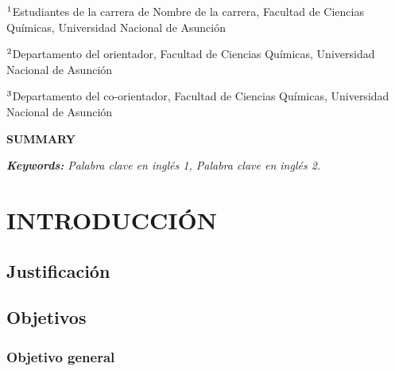 \documentclass[11pt,oneside,a4paper]{book}
\begin{document}
$^{\textnormal{1}}$Estudiantes de la carrera de Nombre de la carrera, Facultad de Ciencias Químicas, Universidad Nacional de Asunción

$^{\textnormal{2}}$Departamento del orientador, Facultad de Ciencias Químicas, Universidad Nacional de Asunción

$^{\textnormal{3}}$Departamento del co-orientador, Facultad de Ciencias Químicas, Universidad Nacional de Asunción


\begin{center}
    \textbf{SUMMARY}
\end{center}
\noindent 
\lipsum[1]


\textit{\textbf{Keywords:} Palabra clave en inglés 1, Palabra clave en inglés 2.}


\justify

\large
\clearpage
{}
\tableofcontents
\pagebreak

\let\origaddvspace\addvspace
 \renewcommand{\addvspace}[1]{}
 \listoftables
 \pagebreak
 \listoffigures
 \renewcommand{\addvspace}[1]{\origaddvspace{#1}}
\pagebreak

\cleardoublepage
{}
\listofappendix
\pagebreak
\cleardoublepage
{}
\printnomenclature[3cm]



\pagebreak
{}

\normalsize

\chapter[CAPÍTULO I - INTRODUCCIÓN]{INTRODUCCIÓN}
\lipsum[1]

\newpage
\section{Justificación}
\lipsum[1]

\newpage
\section{Objetivos}
\subsection{Objetivo general}

\lipsum[2]
\end{document}
